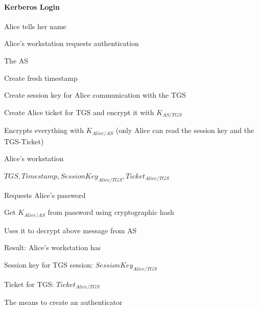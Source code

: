 \documentclass[a4paper]{article}
\begin{document}
\begin{multicols}{3}

    \paragraph{Kerberos Login}
    \begin{enumerate*}
        \item Alice tells her name
        \item Alice’s workstation requests authentication
        \item The AS
        \begin{itemize*}
            \item Create fresh timestamp
            \item Create session key for Alice communication with the TGS %
            \item Create Alice ticket for TGS and encrypt it with $K_{AS/TGS}$ %
            \item Encrypts everything with $K_{Alice/AS}$ (only Alice can read the session key and the TGS-Ticket) %
        \end{itemize*}
        \item Alice’s workstation
        \begin{itemize*}
            \item $TGS, Timestamp, SessionKey_{Alice/TGS} , Ticket_{Alice/TGS}$
            \item Requests Alice’s password
            \item Get $K_{Alice/AS}$ from password using cryptographic hash
            \item Uses it to decrypt above message from AS
        \end{itemize*}
    \end{enumerate*}
    \begin{itemize*}
        \item Result: Alice’s workstation has
        \begin{itemize*}
            \item Session key for TGS session: $SessionKey_{Alice/TGS}$
            \item Ticket for TGS: $Ticket_{Alice/TGS}$
            \item The means to create an authenticator
        \end{itemize*}
    \end{itemize*}


\end{multicols}
\end{document}
